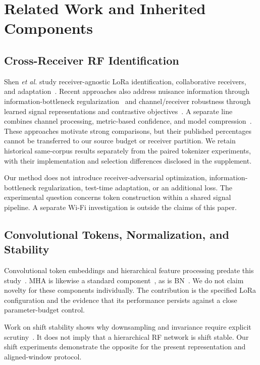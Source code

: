 \documentclass[journal]{IEEEtran}
\begin{document}
\section{Related Work and Inherited Components}
\subsection{Cross-Receiver RF Identification}
Shen \emph{et al.} study receiver-agnostic LoRa identification, collaborative receivers, and adaptation~\cite{shen2024}. Recent approaches also address nuisance information through information-bottleneck regularization~\cite{ibrff2026} and channel/receiver robustness through learned signal representations and contrastive objectives~\cite{ma2025}. A separate line combines channel processing, metric-based confidence, and model compression~\cite{light2026}. These approaches motivate strong comparisons, but their published percentages cannot be transferred to our source budget or receiver partition. We retain historical same-corpus results separately from the paired tokenizer experiments, with their implementation and selection differences disclosed in the supplement.

Our method does not introduce receiver-adversarial optimization, information-bottleneck regularization, test-time adaptation, or an additional loss. The experimental question concerns token construction within a shared signal pipeline. A separate Wi-Fi investigation is outside the claims of this paper.

\subsection{Convolutional Tokens, Normalization, and Stability}
Convolutional token embeddings and hierarchical feature processing predate this study~\cite{cvt2021}. MHA is likewise a standard component~\cite{attention2017}, as is BN~\cite{bn2015}. We do not claim novelty for these components individually. The contribution is the specified LoRa configuration and the evidence that its performance persists against a close parameter-budget control.

Work on shift stability shows why downsampling and invariance require explicit scrutiny~\cite{zhang2019}. It does not imply that a hierarchical RF network is shift stable. Our shift experiments demonstrate the opposite for the present representation and aligned-window protocol.
\end{document}

